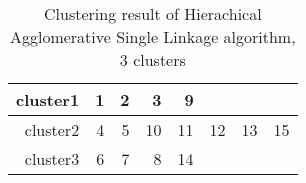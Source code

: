 \begin{table}[htbp]
  \centering
  \caption{Clustering result of Hierachical Agglomerative Single Linkage algorithm, 3 clusters}
    \begin{tabular}{rrrrrrrr}
    \toprule
    cluster1 & 1     & 2     & 3     & 9     &       &       &  \\
    \midrule
    cluster2 & 4     & 5     & 10    & 11    & 12    & 13    & 15 \\
    cluster3 & 6     & 7     & 8     & 14    &       &       &  \\
    \bottomrule
    \end{tabular}%
  \label{tab:cluster_d3}%
\end{table}%
